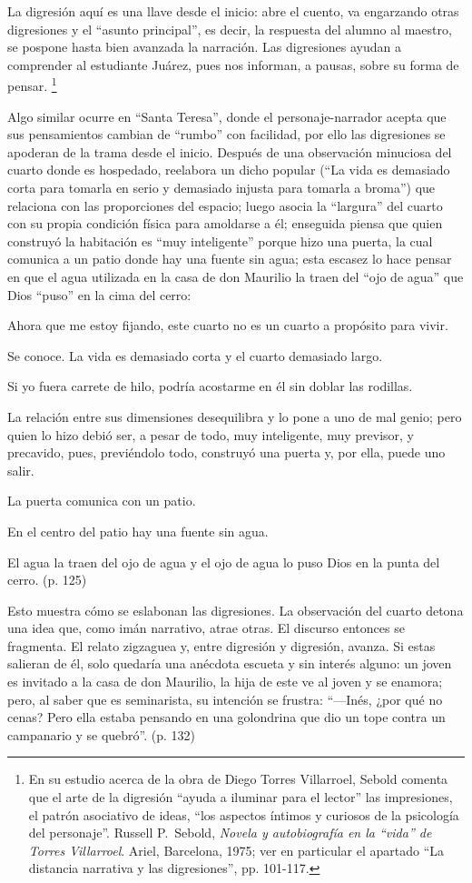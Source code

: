 \documentclass[14pt,twoside,final]{extbook} %
\let\oldfootnote\footnote
\renewcommand\footnote[1]{%
\oldfootnote{\hspace{1mm}#1}}
\begin{document}
La digresión aquí es una llave desde el inicio: abre el cuento, va engarzando otras digresiones y el ``asunto principal'', es decir, la respuesta del alumno al maestro, se pospone hasta bien avanzada la
narración. Las digresiones ayudan a comprender al estudiante Juárez, pues nos informan, a pausas, sobre su forma de pensar.\footnote{En su estudio acerca de la obra de Diego Torres Villarroel, Sebold comenta que el arte de la digresión ``ayuda a iluminar para el lector'' las impresiones, el patrón asociativo de ideas, ``los aspectos íntimos y curiosos de la psicología del personaje''. Russell P.~Sebold, \emph{Novela y autobiografía en la ``vida'' de Torres Villarroel}. Ariel, Barcelona, 1975; ver en particular el apartado ``La distancia narrativa y las digresiones'', pp. 101-117.}

Algo similar ocurre en ``Santa Teresa'', donde el personaje-narrador acepta que sus pensamientos cambian de ``rumbo'' con facilidad, por ello las digresiones se apoderan de la trama desde el inicio. Después de una observación minuciosa del cuarto donde es hospedado, reelabora un dicho popular (``La vida es demasiado corta para tomarla en serio y demasiado injusta para tomarla a broma'') que relaciona con las proporciones del espacio; luego asocia la ``largura'' del cuarto con su propia condición física para amoldarse a él; enseguida piensa que quien construyó la habitación es ``muy inteligente'' porque hizo una puerta, la cual comunica a un patio donde hay una fuente sin agua; esta escasez lo hace pensar en que el agua utilizada en la casa de don Maurilio la traen del ``ojo de agua'' que Dios ``puso'' en la cima del cerro:
\begin{quoting}
Ahora que me estoy fijando, este cuarto no es un cuarto a propósito para vivir.

Se conoce. La vida es demasiado corta y el cuarto demasiado largo.

Si yo fuera carrete de hilo, podría acostarme en él sin doblar las rodillas.

La relación entre sus dimensiones desequilibra y lo pone a uno de mal genio; pero quien lo hizo debió ser, a pesar de todo, muy inteligente, muy previsor, y precavido, pues, previéndolo todo, construyó una puerta y, por ella, puede uno salir.

La puerta comunica con un patio.

En el centro del patio hay una fuente sin agua.

El agua la traen del ojo de agua y el ojo de agua lo puso Dios en la punta del cerro. (p. 125)
\end{quoting}
Esto muestra cómo se eslabonan las digresiones. La observación del cuarto detona una idea que, como imán narrativo, atrae otras. El discurso entonces se fragmenta. El relato zigzaguea y, entre digresión y digresión, avanza. Si estas salieran de él, solo quedaría una anécdota escueta y sin interés alguno: un joven es invitado a la casa de don Maurilio, la hija de este ve al joven y se enamora; pero, al saber que es seminarista, su intención se frustra: ``---Inés, ¿por qué no cenas? Pero ella estaba pensando en una golondrina que dio un tope contra un campanario y se quebró''. (p. 132)
\end{document}
